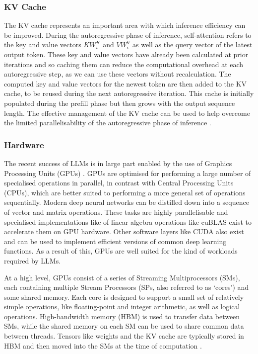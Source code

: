\documentclass[12pt,twoside]{report}
\begin{document}
\subsubsection{KV Cache}\label{subsubsection:kvcache}
The KV cache represents an important area with which inference efficiency can be improved.
During the autoregressive phase of inference, self-attention refers to the key and value vectors $KW_i^K$ and $VW_i^V$ as well as the query vector of the latest output token.
These key and value vectors have already been calculated at prior iterations and so caching them can reduce the computational overhead at each autoregressive step, as we can use these vectors without recalculation.
The computed key and value vectors for the newest token are then added to the KV cache, to be reused during the next autoregressive iteration.
This cache is initially populated during the prefill phase but then grows with the output sequence length. 
The effective management of the KV cache can be used to help overcome the limited parallelisability of the autoregressive phase of inference \cite{shi2024keep} \cite{pope2023efficiently}.

\subsubsection{Hardware}
The recent success of LLMs is in large part enabled by the use of Graphics Processing Units (GPUs) \cite{krizhevsky2012imagenet}.
GPUs are optimised for performing a large number of specialised operations in parallel, in contrast with Central Processing Units (CPUs), which are better suited to performing a more general set of operations sequentially.
Modern deep neural networks can be distilled down into a sequence of vector and matrix operations.
These tasks are highly parallelisable and specialised implementations like of linear algebra operations like cuBLAS \cite{cublas} exist to accelerate them on GPU hardware.
Other software layers like CUDA \cite{nickolls2008scalable} also exist and can be used to implement efficient versions of common deep learning functions.  
As a result of this, GPUs are well suited for the kind of workloads required by LLMs. 

At a high level, GPUs consist of a series of Streaming Multiprocessors (SMs), each containing multiple Stream Processors (SPs, also referred to as `cores') and some shared memory\cite{choquette2021nvidia}. 
Each core is designed to support a small set of relatively simple operations, like floating-point and integer arithmetic, as well as logical operations.
High-bandwidth memory (HBM) is used to transfer data between SMs, while the shared memory on each SM can be used to share common data between threads.
Tensors like weights and the KV cache are typically stored in HBM and then moved into the SMs at the time of computation \cite{pope2023efficiently}.
\end{document}
